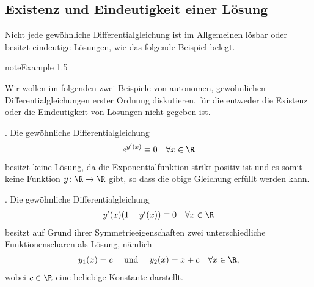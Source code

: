 \documentclass[letterpaper,10pt,english]{jupyterBook}
\begin{document}
\subsection{Existenz und Eindeutigkeit einer Lösung}
\label{\detokenize{ode/repetition:existenz-und-eindeutigkeit-einer-losung}}
\sphinxAtStartPar
Nicht jede gewöhnliche Differentialgleichung ist im Allgemeinen lösbar oder besitzt eindeutige Lösungen, wie das folgende Beispiel belegt.
\label{ode/repetition:example-7}
\begin{sphinxadmonition}{note}{Example 1.5}



\sphinxAtStartPar
Wir wollen im folgenden zwei Beispiele von autonomen, gewöhnlichen Differentialgleichungen erster Ordnung diskutieren, für die entweder die Existenz oder die Eindeutigkeit von Lösungen nicht gegeben ist.

. Die gewöhnliche Differentialgleichung
\begin{equation*}
\begin{split}e^{y'(x)} \equiv 0 \quad \forall x \in \R\end{split}
\end{equation*}
\sphinxAtStartPar
besitzt keine Lösung, da die Exponentialfunktion strikt positiv ist und es somit keine Funktion \(y \colon \R \rightarrow \R\) gibt, so dass die obige Gleichung erfüllt werden kann.

. Die gewöhnliche Differentialgleichung
\begin{equation*}
\begin{split}y'(x)(1-y'(x)) \equiv 0 \quad \forall x \in \R\end{split}
\end{equation*}
\sphinxAtStartPar
besitzt auf Grund ihrer Symmetrieeigenschaften zwei unterschiedliche Funktionenscharen als Lösung, nämlich
\begin{equation*}
\begin{split}y_1(x) = c \quad \text{ und } \quad y_2(x) = x + c \quad \forall x \in \R,\end{split}
\end{equation*}
\sphinxAtStartPar
wobei \(c \in \R\) eine beliebige Konstante darstellt.
\end{sphinxadmonition}
\end{document}
